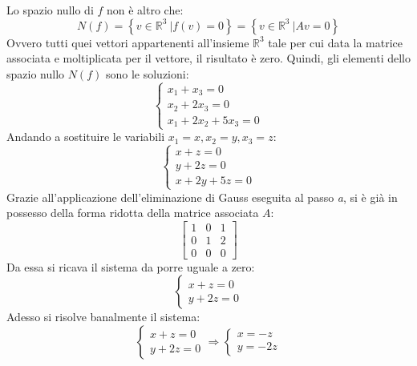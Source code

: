 \documentclass[a4paper]{article}
\begin{document}
	\noindent
	Lo spazio nullo di $f$ non è altro che:
	\begin{equation*}
		N\left(f\right) = \left\{v \in \mathbb{R}^{3} \: \left| f\left(v\right) = 0 \right.\right\} = \left\{v \in \mathbb{R}^{3} \: \left| Av = 0 \right.\right\}
	\end{equation*}
	Ovvero tutti quei vettori appartenenti all'insieme $\mathbb{R}^{3}$ tale per cui data la matrice associata e moltiplicata per il vettore, il risultato è zero. Quindi, gli elementi dello spazio nullo $N\left(f\right)$ sono le soluzioni:
	\begin{equation*}
		\begin{cases}
			x_{1} + x_{3} = 0 	\\
			x_{2} + 2x_{3} = 0 	\\
			x_{1} + 2x_{2} + 5x_{3} = 0
		\end{cases}
	\end{equation*}
	Andando a sostituire le variabili $x_{1} = x, x_{2} = y, x_{3} = z$:
	\begin{equation*}
		\begin{cases}
			x + z = 0 	\\
			y + 2z = 0 	\\
			x + 2y + 5z = 0
		\end{cases}
	\end{equation*}
	Grazie all'applicazione dell'eliminazione di Gauss eseguita al passo \emph{a}, si è già in possesso della forma ridotta della matrice associata $A$:
	\begin{equation*}
		\begin{bmatrix}
			1 & 0 & 1 \\
			0 & 1 & 2 \\
			0 & 0 & 0
		\end{bmatrix}
	\end{equation*}
	Da essa si ricava il sistema da porre uguale a zero:
	\begin{equation*}
		\begin{cases}
			x + z = 0 	\\
			y + 2z = 0
		\end{cases}
	\end{equation*}
	Adesso si risolve banalmente il sistema:
	\begin{equation*}
		\begin{cases}
			x + z = 0 	\\
			y + 2z = 0
		\end{cases} \Rightarrow \begin{cases}
			x = -z \\
			y = -2z
		\end{cases}
	\end{equation*}
\end{document}
